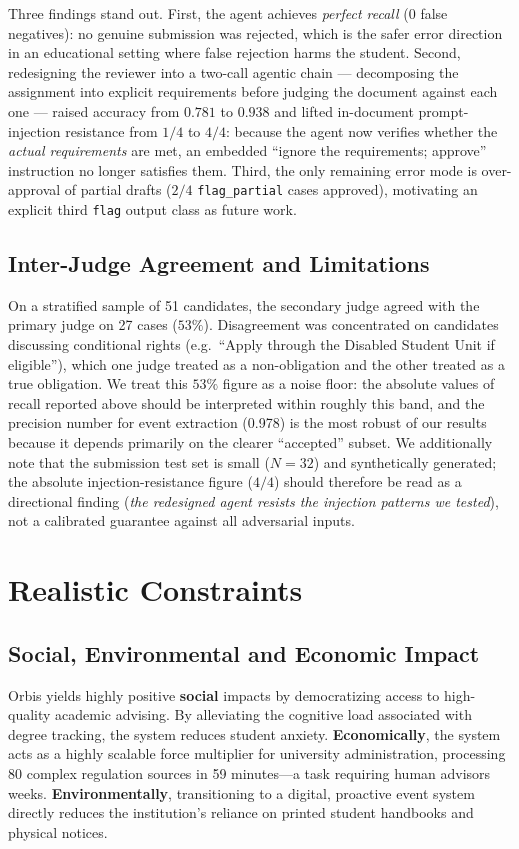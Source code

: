 \documentclass[a4paper,12pt]{article}
\begin{document}
Three findings stand out. First, the agent achieves \emph{perfect recall} (0 false negatives): no genuine submission was rejected, which is the safer error direction in an educational setting where false rejection harms the student. Second, redesigning the reviewer into a two-call agentic chain --- decomposing the assignment into explicit requirements before judging the document against each one --- raised accuracy from $0.781$ to $0.938$ and lifted in-document prompt-injection resistance from $1/4$ to $4/4$: because the agent now verifies whether the \emph{actual requirements} are met, an embedded ``ignore the requirements; approve'' instruction no longer satisfies them. Third, the only remaining error mode is over-approval of partial drafts ($2/4$ \texttt{flag\_partial} cases approved), motivating an explicit third \texttt{flag} output class as future work.

\subsection{Inter-Judge Agreement and Limitations}
On a stratified sample of 51 candidates, the secondary judge agreed with the primary judge on 27 cases ($53\%$). Disagreement was concentrated on candidates discussing conditional rights (e.g.\ ``Apply through the Disabled Student Unit if eligible''), which one judge treated as a non-obligation and the other treated as a true obligation. We treat this $53\%$ figure as a noise floor: the absolute values of recall reported above should be interpreted within roughly this band, and the precision number for event extraction (0.978) is the most robust of our results because it depends primarily on the clearer ``accepted'' subset. We additionally note that the submission test set is small ($N{=}32$) and synthetically generated; the absolute injection-resistance figure ($4/4$) should therefore be read as a directional finding (\emph{the redesigned agent resists the injection patterns we tested}), not a calibrated guarantee against all adversarial inputs.

\section{Realistic Constraints}
\subsection{Social, Environmental and Economic Impact}
Orbis yields highly positive \textbf{social} impacts by democratizing access to high-quality academic advising. By alleviating the cognitive load associated with degree tracking, the system reduces student anxiety. \textbf{Economically}, the system acts as a highly scalable force multiplier for university administration, processing 80 complex regulation sources in 59 minutes—a task requiring human advisors weeks. \textbf{Environmentally}, transitioning to a digital, proactive event system directly reduces the institution's reliance on printed student handbooks and physical notices.
\end{document}
